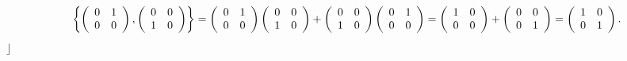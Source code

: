 \documentclass[aps,preprint]{revtex4}%
\begin{document}
\begin{equation}
\left\{  \left(
\begin{array}
[c]{cc}%
0 & 1\\
0 & 0
\end{array}
\right)  ,\left(
\begin{array}
[c]{cc}%
0 & 0\\
1 & 0
\end{array}
\right)  \right\}  =\left(
\begin{array}
[c]{cc}%
0 & 1\\
0 & 0
\end{array}
\right)  \left(
\begin{array}
[c]{cc}%
0 & 0\\
1 & 0
\end{array}
\right)  +\left(
\begin{array}
[c]{cc}%
0 & 0\\
1 & 0
\end{array}
\right)  \left(
\begin{array}
[c]{cc}%
0 & 1\\
0 & 0
\end{array}
\right)  =\left(
\begin{array}
[c]{cc}%
1 & 0\\
0 & 0
\end{array}
\right)  +\left(
\begin{array}
[c]{cc}%
0 & 0\\
0 & 1
\end{array}
\right)  =\left(
\begin{array}
[c]{cc}%
1 & 0\\
0 & 1
\end{array}
\right)  .
\end{equation}
$\rfloor$
\end{document}
